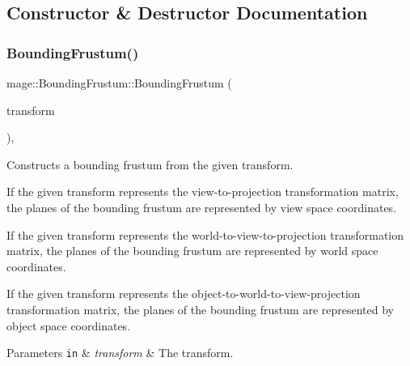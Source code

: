 \subsection{Constructor \& Destructor Documentation}
\hypertarget{classmage_1_1_bounding_frustum_afafc5433abc80e872242b5488ca0c835}{}\label{classmage_1_1_bounding_frustum_afafc5433abc80e872242b5488ca0c835} 
\subsubsection{\texorpdfstring{Bounding\+Frustum()}{BoundingFrustum()}\hspace{0.1cm}{\footnotesize\ttfamily [1/3]}}
{\footnotesize\ttfamily mage\+::\+Bounding\+Frustum\+::\+Bounding\+Frustum (\begin{DoxyParamCaption}\item[{C\+X\+M\+M\+A\+T\+R\+IX}]{transform }\end{DoxyParamCaption})\hspace{0.3cm}{\ttfamily [explicit]}, {\ttfamily [noexcept]}}

Constructs a bounding frustum from the given transform.

If the given transform represents the view-\/to-\/projection transformation matrix, the planes of the bounding frustum are represented by view space coordinates.

If the given transform represents the world-\/to-\/view-\/to-\/projection transformation matrix, the planes of the bounding frustum are represented by world space coordinates.

If the given transform represents the object-\/to-\/world-\/to-\/view-\/projection transformation matrix, the planes of the bounding frustum are represented by object space coordinates.


\begin{DoxyParams}[1]{Parameters}
\mbox{\tt in}  & {\em transform} & The transform. \\
\hline
\end{DoxyParams}
\hypertarget{classmage_1_1_bounding_frustum_a22233ec36a176312dd453bbab682c313}{}\label{classmage_1_1_bounding_frustum_a22233ec36a176312dd453bbab682c313} 
